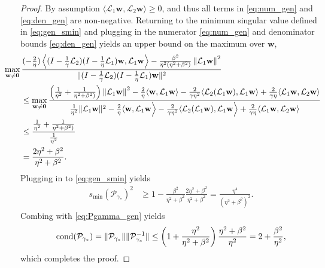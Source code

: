 \documentclass[a4paper,10pt]{article}
\begin{document}
{\begin{proof}
By assumption $\langle\mathcal{L}_1\mathbf{w},\mathcal{L}_2\mathbf{w}\rangle\geq 0$,
and thus all terms in \eqref{eq:num_gen} and \eqref{eq:den_gen} are non-negative.
Returning to the minimum singular value defined in \eqref{eq:gen_smin} and plugging in
the numerator \eqref{eq:num_gen} and denominator bounds \eqref{eq:den_gen} yields
an upper bound on the maximum over $\mathbf{w}$,
%
\begin{align*}
&\hspace{-5ex} \max_{\mathbf{w}\neq\mathbf{0}}
	\frac{(-\tfrac{2}{\eta})\left\langle(I - \tfrac{1}{\gamma}\mathcal{L}_2)(I -
		\tfrac{1}{\eta}\mathcal{L}_1)\mathbf{w},
		\mathcal{L}_1\mathbf{w} \right\rangle- 
		\frac{\beta^2}{\eta^2(\eta^2+\beta^2)}\left\|\mathcal{L}_1\mathbf{w} \right\|^2}
	{\|(I - \tfrac{1}{\gamma}\mathcal{L}_2)(I - \tfrac{1}{\eta}\mathcal{L}_1)\mathbf{w}\|^2} \\
& \leq \max_{\mathbf{w}\neq\mathbf{0}}\frac{\left(\frac{1}{\eta^2} + \frac{1}{\eta^2+\beta^2)}\right)
			\left\|\mathcal{L}_1\mathbf{w} \right\|^2
		- \frac{2}{\eta}\langle\mathbf{w},\mathcal{L}_1\mathbf{w}\rangle
		- \frac{2}{\gamma\eta^2}\langle\mathcal{L}_2(\mathcal{L}_1\mathbf{w}),\mathcal{L}_1\mathbf{w}\rangle
		+ \frac{2}{\gamma\eta}\langle\mathcal{L}_1\mathbf{w},\mathcal{L}_2\mathbf{w}\rangle}
	{\frac{1}{\eta^2}\|\mathcal{L}_1\mathbf{w}\|^2
	- \frac{2}{\eta}\langle \mathbf{w}, \mathcal{L}_1\mathbf{w}\Big\rangle 
	- \frac{2}{\gamma\eta^2}\langle \mathcal{L}_2(\mathcal{L}_1\mathbf{w}),
		\mathcal{L}_1\mathbf{w}\Big\rangle
	+ \frac{2}{\gamma\eta}\langle\mathcal{L}_1\mathbf{w},\mathcal{L}_2\mathbf{w}\rangle} \nonumber\\
& \leq \frac{\frac{1}{\eta^2} + \frac{1}{\eta^2+\beta^2)}}{\frac{1}{\eta^2}} \\
& = \frac{2\eta^2 + \beta^2}{\eta^2+\beta^2}.
\end{align*}
%
Plugging in to \eqref{eq:gen_smin} yields
%
\begin{align}
s_{\min}(\mathcal{P}_{\gamma_*})^2 &\geq 1 - \frac{\beta^2}{\eta^2+\beta^2}
	\frac{2\eta^2 + \beta^2}{\eta^2+\beta^2}
= \frac{\eta^4}{(\eta^2+\beta^2)^2}.
\end{align}
%
Combing with \eqref{eq:Pgamma_gen} yields
%
\begin{align}
\textnormal{cond}(\mathcal{P}_{\gamma_*}) = \|\mathcal{P}_{\gamma_*}\|\|\mathcal{P}_{\gamma_*}^{-1}\|
	\leq \left(1+\frac{\eta^2}{\eta^2+\beta^2}\right)\frac{\eta^2+\beta^2}{\eta^2}
	= 2+\frac{\beta^2}{\eta^2},
\end{align}
%
which completes the proof.
\end{proof}
%


}
\end{document}
